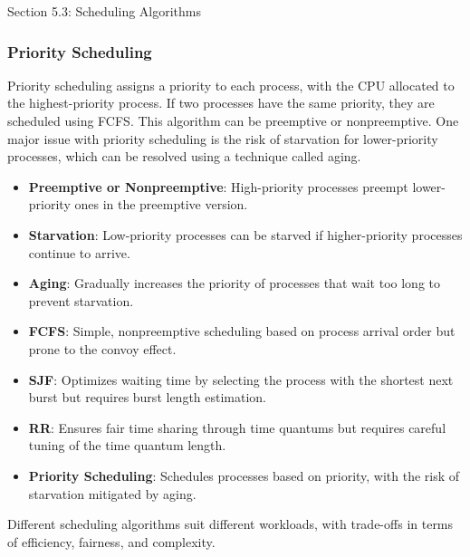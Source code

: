 \begin{notes}{Section 5.3: Scheduling Algorithms}
\begin{highlight}
    \end{highlight}
    
    \subsubsection*{Priority Scheduling}
    
    Priority scheduling assigns a priority to each process, with the CPU allocated to the highest-priority process. If two processes have the same priority, they are scheduled using FCFS. This algorithm can 
    be preemptive or nonpreemptive. One major issue with priority scheduling is the risk of starvation for lower-priority processes, which can be resolved using a technique called aging.
    
    \begin{highlight}
    
        \begin{itemize}
            \item \textbf{Preemptive or Nonpreemptive}: High-priority processes preempt lower-priority ones in the preemptive version.
            \item \textbf{Starvation}: Low-priority processes can be starved if higher-priority processes continue to arrive.
            \item \textbf{Aging}: Gradually increases the priority of processes that wait too long to prevent starvation.
        \end{itemize}
    
    \end{highlight}
    
    \begin{highlight}
    
        \begin{itemize}
            \item \textbf{FCFS}: Simple, nonpreemptive scheduling based on process arrival order but prone to the convoy effect.
            \item \textbf{SJF}: Optimizes waiting time by selecting the process with the shortest next burst but requires burst length estimation.
            \item \textbf{RR}: Ensures fair time sharing through time quantums but requires careful tuning of the time quantum length.
            \item \textbf{Priority Scheduling}: Schedules processes based on priority, with the risk of starvation mitigated by aging.
        \end{itemize}
    
    Different scheduling algorithms suit different workloads, with trade-offs in terms of efficiency, fairness, and complexity.
    
    \end{highlight}
\end{notes}

